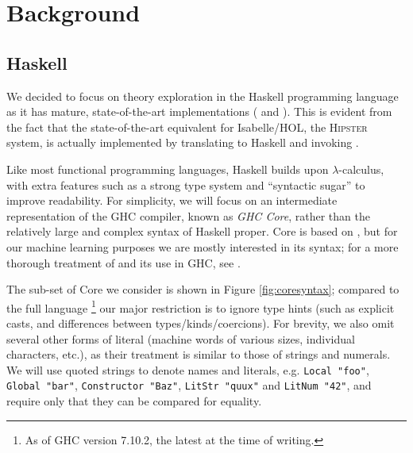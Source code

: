 \section{Background}
\label{sec:background}

\subsection{Haskell}
\label{sec:haskell}

\newcommand{\CVar}{\texttt{Var}}
\newcommand{\CLit}{\texttt{Lit}}
\newcommand{\CApp}{\texttt{App}}
\newcommand{\CLam}{\texttt{Lam}}
\newcommand{\CLet}{\texttt{Let}}
\newcommand{\CCase}{\texttt{Case}}
\newcommand{\CType}{\texttt{Type}}
\newcommand{\CLocal}{\texttt{Local}}
\newcommand{\CGlobal}{\texttt{Global}}
\newcommand{\CConstructor}{\texttt{Constructor}}
\newcommand{\CLitNum}{\texttt{LitNum}}
\newcommand{\CLitStr}{\texttt{LitStr}}
\newcommand{\CAlt}{\texttt{Alt}}
\newcommand{\CDataAlt}{\texttt{DataAlt}}
\newcommand{\CLitAlt}{\texttt{LitAlt}}
\newcommand{\CDefault}{\texttt{Default}}
\newcommand{\CNonRec}{\texttt{NonRec}}
\newcommand{\CRec}{\texttt{Rec}}
\newcommand{\CBind}{\texttt{Bind}}

We decided to focus on theory exploration in the Haskell programming language as it has mature, state-of-the-art implementations (\qspec{} \cite{QuickSpec} and \hspec{} \cite{claessen2013automating}). This is evident from the fact that the state-of-the-art equivalent for Isabelle/HOL, the \textsc{Hipster} \cite{Hipster} system, is actually implemented by translating to Haskell and invoking \hspec{}.

Like most functional programming languages, Haskell builds upon $\lambda$-calculus, with extra features such as a strong type system and ``syntactic sugar'' to improve readability. For simplicity, we will focus on an intermediate representation of the \textsc{GHC} compiler, known as \emph{GHC Core}, rather than the relatively large and complex syntax of Haskell proper. Core is based on \fc{}, but for our machine learning purposes we are mostly interested in its syntax; for a more thorough treatment of \fc{} and its use in GHC, see \cite[Appendix C]{sulzmann2007system}.

The sub-set of Core we consider is shown in Figure \ref{fig:coresyntax}; compared to the full language \footnote{As of GHC version 7.10.2, the latest at the time of writing.} our major restriction is to ignore type hints (such as explicit casts, and differences between types/kinds/coercions). For brevity, we also omit several other forms of literal (machine words of various sizes, individual characters, etc.), as their treatment is similar to those of strings and numerals. We will use quoted strings to denote names and literals, e.g. \texttt{Local "foo"}, \texttt{Global "bar"}, \texttt{Constructor "Baz"}, \texttt{LitStr "quux"} and \texttt{LitNum "42"}, and require only that they can be compared for equality.

